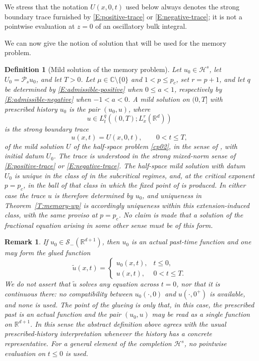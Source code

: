 \documentclass[11pt,letter]{amsart}
\def \RNu {\mathbb{R}^{d+1}}
\def \R {\mathbb{R}}
\newcommand{\Rd}{\mathbb R^d}
\numberwithin{equation}{section}
\newcommand{\C}{\mathbb{C}}
\newcommand{\Sm}{\mathscr S_-(\RNu)}
\newtheorem{remark}[theorem]{Remark}
\newtheorem{definition}[theorem]{Definition}
\numberwithin{equation}{section}
\begin{document}
We stress that the notation \(U(x,0,t)\) used below always denotes
the strong boundary trace furnished by
\eqref{E:positive-trace} or \eqref{E:negative-trace}; it is not a
pointwise evaluation at \(z=0\) of an oscillatory bulk integral.

We can now give the notion of solution that will be used for the
memory problem.

\begin{definition}[Mild solution of the memory problem]
\label{D:memory-solution}
Let $u_0\in\mathcal H^s$, let $U_0=\mathcal P_su_0$, and let $T>0$. Let
$\mu\in\C\setminus\{0\}$ and $1<p\le p_c$, set $r=p+1$, and let $q$ be
determined by \eqref{E:admissible-positive} when $0\le a<1$, respectively by
\eqref{E:admissible-negative} when $-1<a<0$.
A mild solution on $(0,T]$ with prescribed history $u_0$ is the pair $(u_0,u)$,
where
\[
u\in L_t^q((0,T);L_x^r(\Rd))
\]
is the strong boundary trace
\[
u(x,t)=U(x,0,t),\qquad 0<t\le T,
\]
of the mild solution $U$ of the half-space problem \eqref{cp02}, in the sense
of \cite{GS2}, with initial datum $U_0$. The trace is understood in the strong
mixed-norm sense of \eqref{E:positive-trace} or \eqref{E:negative-trace}.
The half-space mild solution with datum $U_0$ is unique in the class of
\cite[Definition~2.6]{GS2} in the subcritical regimes, and, at the critical
exponent $p=p_c$, in the ball of that class in which the fixed point of
\cite[Theorems~2.9(1) and~2.10(1)]{GS2} is produced. In either case the trace
$u$ is therefore determined by $u_0$, and uniqueness in
Theorem~\ref{T:memory-wp} is accordingly uniqueness within this
extension-induced class, with the same proviso at $p=p_c$. No claim is made
that a solution of the fractional equation arising in some other sense must be
of this form.
\end{definition}

\begin{remark}\label{R:concrete-history}
If $u_0\in\Sm$, then $u_0$ is an actual past-time function and one may form the
glued function
\[
\widetilde u(x,t)=
\begin{cases}
u_0(x,t),&t\le0,\\
u(x,t),&0<t\le T.
\end{cases}
\]
We do not assert that $\widetilde u$ solves any equation across $t=0$, nor that
it is continuous there: no compatibility between $u_0(\cdot,0)$ and
$u(\cdot,0^+)$ is available, and none is used. The point of the glueing is only
that, in this case, the prescribed past is an actual function and the pair
$(u_0,u)$ may be read as a single function on $\R^{d+1}$. In this sense the
abstract definition above agrees with the usual prescribed-history
interpretation whenever the history has a concrete representative. For a
general element of the completion $\mathcal H^s$, no pointwise evaluation on
$t\le0$ is used.
\end{remark}
\end{document}
